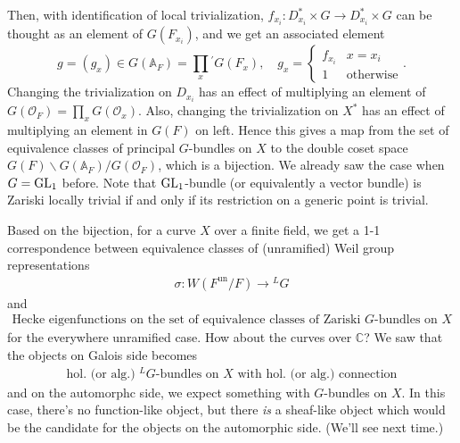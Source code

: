 Then, with identification of local trivialization, $f_{x_i}: D_{x_{i}}^{*} \times G \to D_{x_{i}}^{*} \times G$ can be thought as an element of $G(F_{x_i})$, and we get
an associated element
$$
g = (g_{x}) \in G(\mathbb{A}_F) = \prod_{x}{}^{'}G(F_{x}), \quad g_{x} = \begin{cases} f_{x_{i}}& x = x_i \\ 1 & \text{otherwise}\end{cases}.
$$
Changing the trivialization on $D_{x_i}$ has an effect of multiplying an element of $G(\mathcal{O}_F) = \prod_x G(\mathcal{O}_x)$.
Also, changing the trivialization on $X^{*}$ has an effect of multiplying an element in $G(F)$ on left.
Hence this gives a map from the set of equivalence classes of principal $G$-bundles on $X$ to the double coset space
$G(F) \backslash G(\mathbb{A}_F) / G(\mathcal{O}_F)$, which is a bijection.
We already saw the case when $G = \operatorname{\mathrm{GL}}_1$ before.
Note that $\operatorname{\mathrm{GL}}_1$-bundle (or equivalently a vector bundle) is Zariski locally trivial if and only if its restriction on a generic point is trivial.

Based on the bijection, for a curve $X$ over a finite field, we get a 1-1 correspondence between equivalence classes of (unramified) Weil group representations
\begin{align*}
    \boxed{
        \sigma: W(F^{\mathrm{un}} /F) \to {}^{L}G
    }
\end{align*}
and 
\begin{align*}
    \boxed{
        \text{Hecke eigenfunctions on the set of equivalence classes of Zariski }G\text{-bundles on $X$}
    }
\end{align*}
for the everywhere unramified case.
How about the curves over $\mathbb{C}$?
We saw that the objects on Galois side becomes
\begin{align*}
    \boxed{
        \text{hol. (or alg.) }{}^{L}G\text{-bundles on }X\text{ with hol. (or alg.) connection}
    }
\end{align*}
and on the automorphc side, we expect something with $G$-bundles on $X$.
In this case, there's no function-like object, but there \emph{is} a sheaf-like object which would be the candidate for the objects on the automorphic side.
(We'll see next time.)

